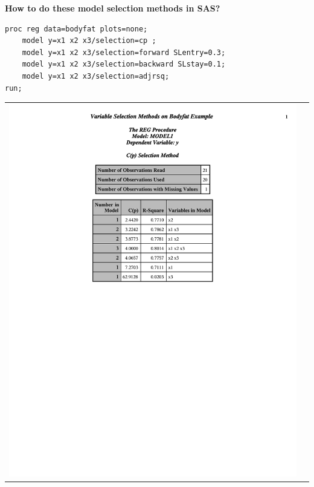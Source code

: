 \textbf{How to do these model selection methods in SAS?}\\
\begin{small}
\begin{verbatim}
proc reg data=bodyfat plots=none;
    model y=x1 x2 x3/selection=cp ;
    model y=x1 x2 x3/selection=forward SLentry=0.3;
    model y=x1 x2 x3/selection=backward SLstay=0.1;
  	model y=x1 x2 x3/selection=adjrsq;
run;
\end{verbatim}
\end{small}

\begin{center}
\begin{tabular}{cc}
\includegraphics[page=1,scale=0.6,trim=40mm 30mm 20mm 10mm]{bodyfatexampleselection}&

\end{tabular}
\end{center}
